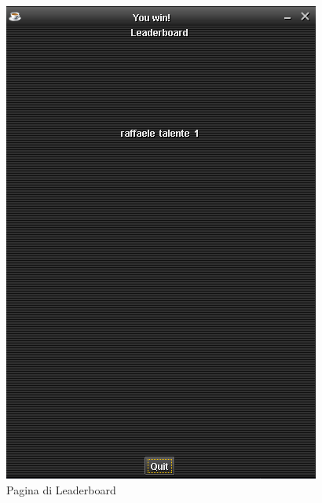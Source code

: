 \begin{figure}
    \centering
    \includegraphics[scale=0.5]{img/leaderboard-page}
    \caption{Pagina di Leaderboard}
    \label{fig:leaderboard-page}
\end{figure}

